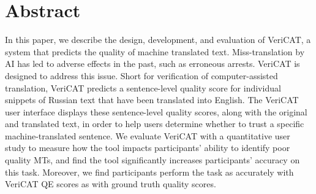 \section{Abstract}

In this paper, we describe the design, development, and evaluation of VeriCAT, a system that predicts the quality of machine translated text. Miss-translation by AI has led to adverse effects in the past, such as erroneous arrests. VeriCAT is designed to address this issue. Short for verification of computer-assisted translation, VeriCAT predicts a sentence-level quality score for individual snippets of Russian text that have been translated into English. The VeriCAT user interface displays these sentence-level quality scores, along with the original and translated text, in order to help users determine whether to trust a specific machine-translated sentence. We evaluate VeriCAT with a quantitative user study to measure how the tool impacts participants’ ability to identify poor quality MTs, and find the tool significantly increases participants’ accuracy on this task. Moreover, we find participants perform the task as accurately with VeriCAT QE scores as with ground truth quality scores.